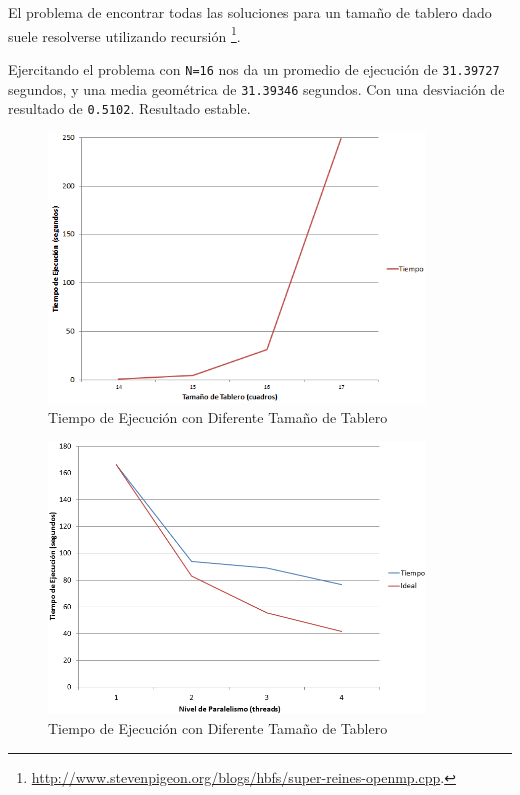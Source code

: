 \documentclass[a4paper]{report}
\begin{document}
El problema de encontrar todas las soluciones para un tamaño de tablero dado suele resolverse utilizando recursión \footnote{\href{http://www.stevenpigeon.org/blogs/hbfs/super-reines-openmp.cpp}{http://www.stevenpigeon.org/blogs/hbfs/super-reines-openmp.cpp}.}.

\bigskip

Ejercitando el problema con {\tt N=16} nos da un promedio de ejecución de {\tt 31.39727} segundos, y una media geométrica de {\tt 31.39346} segundos. Con una desviación de resultado de {\tt 0.5102}. Resultado estable.

\bigskip

\begin{figure}[H]
\centering
\includegraphics[width=10cm]{queen-problem.png}
\caption{Tiempo de Ejecución con Diferente Tamaño de Tablero}
\label{fig:queen-problem}
\end{figure}

\begin{figure}[H]
\centering
\includegraphics[width=10cm]{queen-scaling.png}
\caption{Tiempo de Ejecución con Diferente Tamaño de Tablero}
\label{fig:queen-scaling}
\end{figure}
\end{document}
